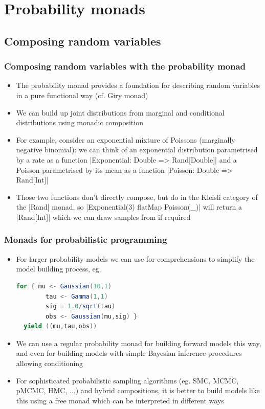 \documentclass[mathserif,handout]{beamer}
\begin{document}

\section{Probability monads}

\subsection{Composing random variables}

\begin{frame}[fragile]
  \frametitle{Composing random variables with the probability monad}
  \begin{itemize}
  \item The \alert{probability monad} provides a foundation for describing random variables in a pure functional way (cf. \alert{Giry monad})
  \item We can build up joint distributions from marginal and conditional distributions using \alert{monadic composition}
  \item For example, consider an exponential mixture of Poissons (marginally negative binomial): we can think of an exponential distribution parametrised by a rate as a function |Exponential: Double => Rand[Double]| and a Poisson parametrised by its mean as a function |Poisson: Double => Rand[Int]|
    \item Those two functions don't directly compose, but do in the Kleisli category of the |Rand| monad, so |Exponential(3) flatMap {Poisson(_)}| will return a |Rand[Int]| which we can draw samples from if required
  \end{itemize}
\end{frame}


\begin{frame}[fragile]
  \frametitle{Monads for probabilistic programming}
  \begin{itemize}
    \item For larger probability models we can use \alert{for-comprehensions} to simplify the model building process, eg.
\begin{lstlisting}[language=scala]
  for { mu <- Gaussian(10,1)
        tau <- Gamma(1,1)
        sig = 1.0/sqrt(tau)
        obs <- Gaussian(mu,sig) }
  yield ((mu,tau,obs))
\end{lstlisting}
  \item We can use a regular probability monad for building forward models this way, and even for building models with simple Bayesian inference procedures allowing conditioning
    \item For sophisticated probabilistic sampling algorithms (eg. SMC, MCMC, pMCMC, HMC, ...) and hybrid compositions, it is better to build models like this using a \alert{free monad} which can be \alert{interpreted} in different ways
  \end{itemize}
\end{frame}
\end{document}
